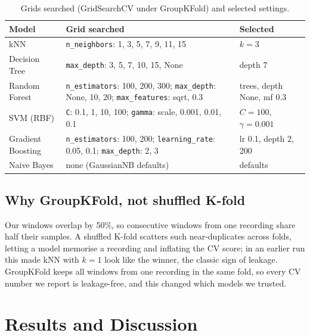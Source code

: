 \documentclass[runningheads]{llncs}
\begin{document}
\begin{table}[ht]
\caption{Grids searched (GridSearchCV under GroupKFold) and selected settings.}
\label{tab:grids}
\centering\footnotesize
\setlength{\tabcolsep}{5pt}
\renewcommand{\arraystretch}{1.25}
\begin{tabular}{@{}l >{\raggedright\arraybackslash}p{6.3cm} >{\raggedright\arraybackslash}p{2.1cm}@{}}
\toprule
\textbf{Model} & \textbf{Grid searched} & \textbf{Selected} \\
\midrule
kNN & \texttt{n\_neighbors}: 1, 3, 5, 7, 9, 11, 15 & $k = 3$ \\
Decision Tree & \texttt{max\_depth}: 3, 5, 7, 10, 15, None & depth 7 \\
Random Forest & \texttt{n\_estimators}: 100, 200, 300; \texttt{max\_depth}: None, 10, 20; \texttt{max\_features}: sqrt, 0.3 & 300 trees, depth None, mf 0.3 \\
SVM (RBF) & \texttt{C}: 0.1, 1, 10, 100; \texttt{gamma}: scale, 0.001, 0.01, 0.1 & $C{=}100$, $\gamma{=}0.001$ \\
Gradient Boosting & \texttt{n\_estimators}: 100, 200; \texttt{learning\_rate}: 0.05, 0.1; \texttt{max\_depth}: 2, 3 & lr 0.1, depth 2, 200 \\
Naive Bayes & none (GaussianNB defaults) & defaults \\
\bottomrule
\end{tabular}
\end{table}

\subsection{Why GroupKFold, not shuffled K-fold}
\label{sec:cv}
Our windows overlap by 50\%, so consecutive windows from one recording share half their samples. A shuffled K-fold scatters such near-duplicates across folds, letting a model memorise a recording and inflating the CV score; in an earlier run this made kNN with $k=1$ look like the winner, the classic sign of leakage. GroupKFold keeps all windows from one recording in the same fold, so every CV number we report is leakage-free, and this changed which models we trusted.


\section{Results and Discussion}
\label{sec:discussion}
\end{document}
